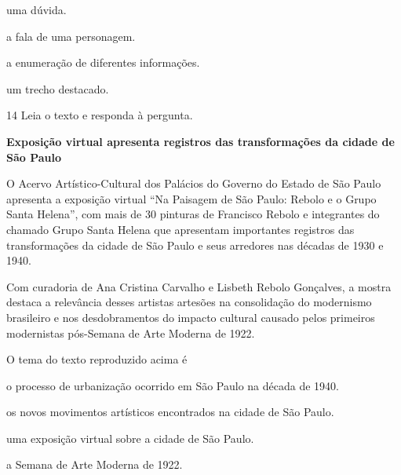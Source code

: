 \begin{myquote}
\begin{myescolha}
\begin{escolha}
  \item uma dúvida.

  \item a fala de uma personagem.

  \item a enumeração de diferentes informações.

  \item um trecho destacado.
\end{escolha}

\num{14} Leia o texto e responda à pergunta.

\begin{myquote}
\textbf{Exposição virtual apresenta registros das transformações 
da cidade de São Paulo}

O Acervo Artístico-Cultural dos Palácios do Governo do Estado de São
Paulo apresenta a exposição virtual ``Na Paisagem de São Paulo: Rebolo e
o Grupo Santa Helena'', com mais de 30 pinturas de Francisco Rebolo e
integrantes do chamado Grupo Santa Helena que apresentam importantes
registros das transformações da cidade de São Paulo e seus arredores nas
décadas de 1930 e 1940.

Com curadoria de Ana Cristina Carvalho e Lisbeth Rebolo Gonçalves, a
mostra destaca a relevância desses artistas artesões na consolidação do
modernismo brasileiro e nos desdobramentos do impacto cultural causado
pelos primeiros modernistas pós-Semana de Arte Moderna de 1922.

\end{myquote}

O tema do texto reproduzido acima é

\begin{escolha}
  \item o processo de urbanização ocorrido em São Paulo na década de 1940.

  \item os novos movimentos artísticos encontrados na cidade de São Paulo.

  \item uma exposição virtual sobre a cidade de São Paulo.

  \item a Semana de Arte Moderna de 1922.
\end{escolha}


\end{myescolha}
\end{myquote}
